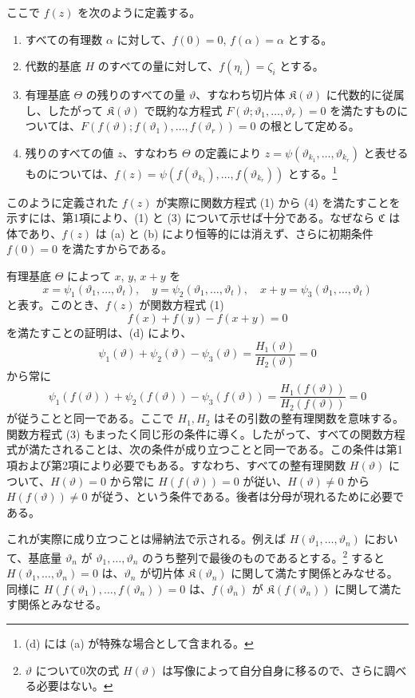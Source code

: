 \documentclass[11pt]{article}
\begin{document}
ここで $f(z)$ を次のように定義する。
\begin{enumerate}
\item[a)] すべての有理数 $\alpha$ に対して、$f(0)=0$, $f(\alpha)=\alpha$ とする。
\item[b)] 代数的基底 $H$ のすべての量に対して、$f(\eta_i)=\zeta_i$ とする。
\item[c)] 有理基底 $\Theta$ の残りのすべての量 $\vartheta$、すなわち切片体 $\mathfrak K(\vartheta)$ に代数的に従属し、したがって $\mathfrak K(\vartheta)$ で既約な方程式 $F(\vartheta;\vartheta_1,\ldots,\vartheta_r)=0$ を満たすものについては、$F(f(\vartheta);f(\vartheta_1),\ldots,f(\vartheta_r))=0$ の根として定める。
\item[d)] 残りのすべての値 $z$、すなわち $\Theta$ の定義により $z=\psi(\vartheta_{k_1},\ldots,\vartheta_{k_r})$ と表せるものについては、$f(z)=\psi(f(\vartheta_{k_1}),\ldots,f(\vartheta_{k_r}))$ とする。\footnote{(d) には (a) が特殊な場合として含まれる。}
\end{enumerate}

このように定義された $f(z)$ が実際に関数方程式 (1) から (4) を満たすことを示すには、第1項により、(1) と (3) について示せば十分である。なぜなら $\mathfrak C$ は体であり、$f(z)$ は (a) と (b) により恒等的には消えず、さらに初期条件 $f(0)=0$ を満たすからである。

有理基底 $\Theta$ によって $x$, $y$, $x+y$ を
\[
x=\psi_1(\vartheta_1,\ldots,\vartheta_t),\quad
 y=\psi_2(\vartheta_1,\ldots,\vartheta_t),\quad
 x+y=\psi_3(\vartheta_1,\ldots,\vartheta_t)
\]
と表す。このとき、$f(z)$ が関数方程式 (1)
\[
f(x)+f(y)-f(x+y)=0
\]
を満たすことの証明は、(d) により、
\[
\psi_1(\vartheta)+\psi_2(\vartheta)-\psi_3(\vartheta)=\frac{H_1(\vartheta)}{H_2(\vartheta)}=0
\]
から常に
\[
\psi_1(f(\vartheta))+\psi_2(f(\vartheta))-\psi_3(f(\vartheta))
=\frac{H_1(f(\vartheta))}{H_2(f(\vartheta))}=0
\]
が従うことと同一である。ここで $H_1,H_2$ はその引数の整有理関数を意味する。関数方程式 (3) もまったく同じ形の条件に導く。したがって、すべての関数方程式が満たされることは、次の条件が成り立つことと同一である。この条件は第1項および第2項により必要でもある。すなわち、すべての整有理関数 $H(\vartheta)$ について、$H(\vartheta)=0$ から常に $H(f(\vartheta))=0$ が従い、$H(\vartheta)\ne0$ から $H(f(\vartheta))\ne0$ が従う、という条件である。後者は分母が現れるために必要である。

これが実際に成り立つことは帰納法で示される。例えば $H(\vartheta_1,\ldots,\vartheta_n)$ において、基底量 $\vartheta_n$ が $\vartheta_1,\ldots,\vartheta_n$ のうち整列で最後のものであるとする。\footnote{$\vartheta$ について0次の式 $H(\vartheta)$ は写像によって自分自身に移るので、さらに調べる必要はない。} すると $H(\vartheta_1,\ldots,\vartheta_n)=0$ は、$\vartheta_n$ が切片体 $\mathfrak K(\vartheta_n)$ に関して満たす関係とみなせる。同様に $H(f(\vartheta_1),\ldots,f(\vartheta_n))=0$ は、$f(\vartheta_n)$ が $\mathfrak K(f(\vartheta_n))$ に関して満たす関係とみなせる。
\end{document}
